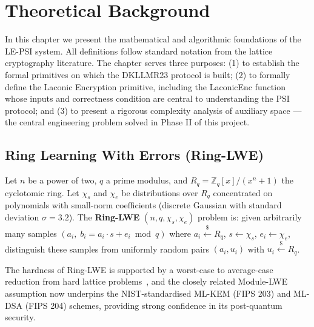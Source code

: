 \chapter{Theoretical Background}

In this chapter we present the mathematical and algorithmic foundations of the
LE-PSI system. All definitions follow standard notation from the lattice
cryptography literature. The chapter serves three purposes: (1) to establish the
formal primitives on which the DKLLMR23 protocol is built; (2) to formally define
the Laconic Encryption primitive, including the \textsf{LaconicEnc} function whose
inputs and correctness condition are central to understanding the PSI protocol; and
(3) to present a rigorous complexity analysis of auxiliary space --- the central
engineering problem solved in Phase II of this project.

\section{Ring Learning With Errors (Ring-LWE)}

\begin{definition}\label{def:rlwe}
Let $n$ be a power of two, $q$ a prime modulus, and
$R_q = \mathbb{Z}_q[x]/(x^n + 1)$
the cyclotomic ring. Let $\chi_s$ and $\chi_e$ be distributions over $R_q$
concentrated on polynomials with small-norm coefficients (discrete Gaussian with
standard deviation $\sigma = 3.2$). The \textbf{Ring-LWE} $(n, q, \chi_s, \chi_e)$
problem is: given arbitrarily many samples
$(a_i,\; b_i = a_i \cdot s + e_i \bmod q)$
where $a_i \xleftarrow{\$} R_q$, $s \leftarrow \chi_s$, $e_i \leftarrow \chi_e$,
distinguish these samples from uniformly random pairs $(a_i, u_i)$ with
$u_i \xleftarrow{\$} R_q$.
\end{definition}

The hardness of Ring-LWE is supported by a worst-case to average-case reduction
from hard lattice problems~\cite{lyubashevsky2010ideal}, and the closely related
Module-LWE assumption now underpins the NIST-standardised ML-KEM (FIPS 203) and
ML-DSA (FIPS 204) schemes, providing strong confidence in its post-quantum security.

